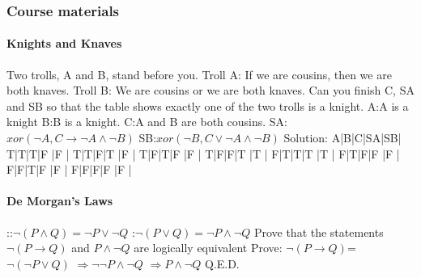 \documentclass{article}
\begin{document}
\subsubsection{Course materials}
\paragraph{Knights and Knaves}
Two trolls, A and B, stand before you.\newline
Troll A: If we are cousins, then we are both knaves.\newline
Troll B: We are cousins or we are both knaves.
\newline
Can you finish C, SA and SB so that the table shows exactly one of the two trolls is a knight.\newline
A:A is a knight\newline
B:B is a knight.\newline
C:A and B are both cousins.\newline
SA:$xor(\lnot A,C \to \lnot A \land \lnot B)$\newline
SB:$xor(\lnot B,C\lor \lnot A \land \lnot B)$\newline
Solution:\newline
A|B|C|SA|SB|\newline
T|T|T|F |F |\newline
T|T|F|T |F |\newline
T|F|T|F |F |\newline
T|F|F|T |T |\newline
F|T|T|T |T |\newline
F|T|F|F |F |\newline
F|F|T|F |F |\newline
F|F|F|F |F |
\paragraph{De Morgan’s Laws}::$\lnot (P\land Q)=\lnot P \lor \lnot Q$ :$\lnot (P\lor Q)=\lnot P \land \lnot Q$\newline
Prove that the statements $\lnot (P \to Q)$ and $P \land \lnot Q$ are logically equivalent\newline
Prove:\newline
$\lnot (P \to Q)$=$\lnot (\lnot P \lor Q)$\newline
$\Longrightarrow \lnot \lnot P \land \lnot Q$\newline
$\Longrightarrow P \land \lnot Q$\newline
Q.E.D.
\end{document}
